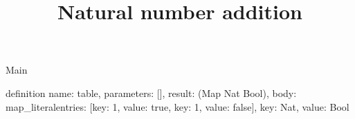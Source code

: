 \begin{lexlean}{Main}
\title{Natural number addition}
\begin{semanticmodule}
definition{
  name: table,
  parameters: [],
  result: (Map Nat Bool),
  body: map_literal{entries: [{key: 1, value: true}, {key: 1, value: false}], key: Nat, value: Bool}
}
\end{semanticmodule}
\end{lexlean}
